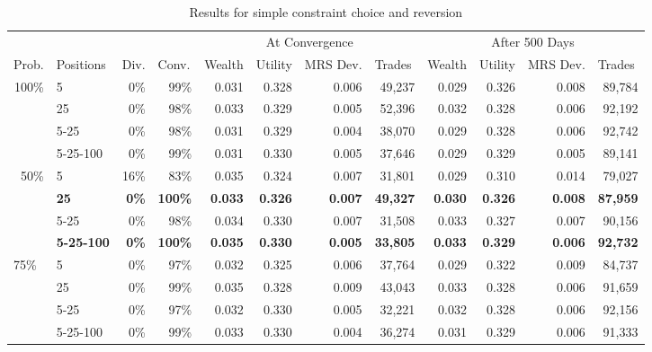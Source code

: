 \documentclass[12pt,a4paper,titlepage]{article}
\begin{document}
\begin{table}
  \begin{tabular}{rl|rr|rrrr|rrrr}

    \multicolumn{1}{l}{} &  & \multicolumn{1}{l}{} & \multicolumn{1}{l}{} & \multicolumn{ 4}{|c|}{At Convergence} & \multicolumn{ 4}{c}{After 500 Days} \\ 
    \multicolumn{1}{l}{Prob.} & Positions & \multicolumn{1}{l}{Div.} & \multicolumn{1}{l|}{Conv.} & \multicolumn{1}{l}{Wealth} & \multicolumn{1}{l}{Utility} & \multicolumn{1}{l}{MRS Dev.} & \multicolumn{1}{l|}{Trades} & \multicolumn{1}{l}{Wealth} & \multicolumn{1}{l}{Utility} & \multicolumn{1}{l}{MRS Dev.} & \multicolumn{1}{l}{Trades} \\ 
    \hline
    \multicolumn{ 1}{r}{100\%} & 5 & 0\% & 99\% & 0.031 & 0.328 & 0.006 & 49,237 & 0.029 & 0.326 & 0.008 & 89,784 \\ 
    \multicolumn{ 1}{r}{} & 25 & 0\% & 98\% & 0.033 & 0.329 & 0.005 & 52,396 & 0.032 & 0.328 & 0.006 & 92,192 \\ 
    \multicolumn{ 1}{r}{} & 5-25 & 0\% & 98\% & 0.031 & 0.329 & 0.004 & 38,070 & 0.029 & 0.328 & 0.006 & 92,742 \\ 
    \multicolumn{ 1}{r}{} & 5-25-100 & 0\% & 99\% & 0.031 & 0.330 & 0.005 & 37,646 & 0.029 & 0.329 & 0.005 & 89,141 \\ 
    \multicolumn{ 1}{r}{50\%} & 5 & 16\% & 83\% & 0.035 & 0.324 & 0.007 & 31,801 & 0.029 & 0.310 & 0.014 & 79,027 \\ 
    \multicolumn{ 1}{r}{} & \textbf{25} & \textbf{0\%} & \textbf{100\%} & \textbf{0.033} & \textbf{0.326} & \textbf{0.007} & \textbf{49,327} & \textbf{0.030} & \textbf{0.326} & \textbf{0.008} & \textbf{87,959} \\ 
    \multicolumn{ 1}{r}{} & 5-25 & 0\% & 98\% & 0.034 & 0.330 & 0.007 & 31,508 & 0.033 & 0.327 & 0.007 & 90,156 \\ 
    \multicolumn{ 1}{r}{} & \textbf{5-25-100} & \textbf{0\%} & \textbf{100\%} & \textbf{0.035} & \textbf{0.330} & \textbf{0.005} & \textbf{33,805} & \textbf{0.033} & \textbf{0.329} & \textbf{0.006} & \textbf{92,732} \\ 
    \multicolumn{ 1}{l}{75\%} & 5 & 0\% & 97\% & 0.032 & 0.325 & 0.006 & 37,764 & 0.029 & 0.322 & 0.009 & 84,737 \\ 
    \multicolumn{ 1}{r}{} & 25 & 0\% & 99\% & 0.035 & 0.328 & 0.009 & 43,043 & 0.033 & 0.328 & 0.006 & 91,659 \\ 
    \multicolumn{ 1}{l}{} & 5-25 & 0\% & 97\% & 0.032 & 0.330 & 0.005 & 32,221 & 0.032 & 0.328 & 0.006 & 92,156 \\ 
    \multicolumn{ 1}{l}{} & 5-25-100 & 0\% & 99\% & 0.033 & 0.330 & 0.004 & 36,274 & 0.031 & 0.329 & 0.006 & 91,333 \\ 
  \end{tabular}
  \caption{Results for simple constraint choice and reversion}
  \label{tab:bt2}
\end{table}
\end{document}
